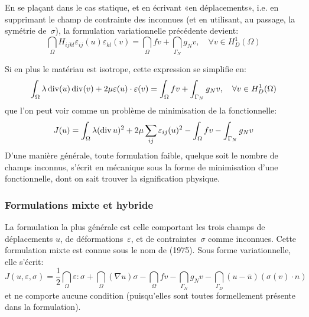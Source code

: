 En se plaçant dans le cas statique, et en écrivant «en déplacements», i.e. en supprimant le champ de contrainte des inconnues (et en utilisant, au passage, la symétrie de~$\sigma$), la formulation variationnelle précédente devient:
\begin{equation}
\dint_\Omega H_{ijkl}\varepsilon_{ij}(u)\varepsilon_{kl}(v) = \dint_\Omega fv +
\dint_{\Gamma_N} g_N v, \quad \forall v\in H^1_D(\Omega)
\end{equation}

\medskip
Si en plus le matériau est isotrope, cette expression se simplifie en:
\begin{equation}
\displaystyle\int_\Omega \lambda \operatorname{div}(u)\operatorname{div}(v)+2\mu\varepsilon(u)\cdot\varepsilon(v) = \displaystyle\int_\Omega fv +
\displaystyle\int_{\Gamma_N} g_N v, \quad \forall v\in H^1_D(\Omega)
\end{equation}
que l'on peut voir comme un problème de minimisation de la fonctionnelle:
\begin{equation}
J(u)=
\displaystyle\int_\Omega \lambda (\operatorname{div} u)^2+2\mu\displaystyle\sum_{ij}\varepsilon_{ij}(u)^2 - \displaystyle\int_\Omega fv -
\displaystyle\int_{\Gamma_N} g_N v
\end{equation}
\medskip
D'une manière générale, toute formulation faible, quelque soit le nombre de champs inconnus, s'écrit en mécanique sous la forme de minimisation d'une fonctionnelle, dont on sait trouver la signification physique.

\medskip
\subsubsection{Formulations mixte et hybride}\label{Sec-MH}
La formulation la plus générale est celle comportant les trois champs de déplacements $u$, de déformations~$\varepsilon$, et de contraintes~$\sigma$ comme inconnues.
Cette formulation mixte est connue sous le nom de  (1975). Sous forme variationnelle, elle s'écrit:
\begin{equation}
J(u,\varepsilon,\sigma) =
\frac12 \dint_\Omega \varepsilon:\sigma
+\dint_\Omega (\nabla u) \sigma
- \dint_\Omega f v
- \dint_{\Gamma_N} g_N v
- \dint_{\Gamma_D} (u-\overline{u}) (\sigma(v)\cdot n)
\end{equation}
et ne comporte aucune condition (puisqu'elles sont toutes formellement présente dans la formulation).

